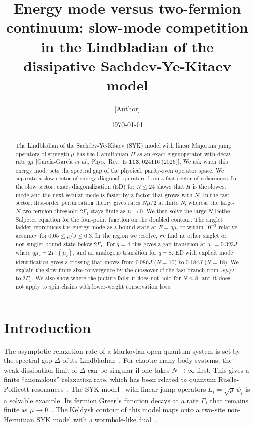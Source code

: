 \documentclass[aps,pre,twocolumn,superscriptaddress,amsmath,amssymb,10pt]{revtex4-2}
\begin{document}
\title{Energy mode versus two-fermion continuum: slow-mode competition in the Lindbladian of the dissipative Sachdev-Ye-Kitaev model}

\author{[Author]}
\affiliation{[Affiliation]}

\date{\today}

\begin{abstract}
The Lindbladian of the Sachdev-Ye-Kitaev (SYK) model with linear Majorana jump operators of strength $\mu$ has the Hamiltonian $H$ as an exact eigenoperator with decay rate $q\mu$ [Garc\'ia-Garc\'ia \emph{et al.}, Phys.\ Rev.\ E \textbf{113}, 024116 (2026)]. We ask when this energy mode sets the spectral gap of the physical, parity-even operator space. We separate a slow sector of energy-diagonal operators from a fast sector of coherences. In the slow sector, exact diagonalization (ED) for $N\le24$ shows that $H$ is the slowest mode and the next secular mode is faster by a factor that grows with $N$. In the fast sector, first-order perturbation theory gives rates $N\mu/2$ at finite $N$, whereas the large-$N$ two-fermion threshold $2\Gamma_1$ stays finite as $\mu\to0$. We then solve the large-$N$ Bethe-Salpeter equation for the four-point function on the doubled contour. The singlet ladder reproduces the energy mode as a bound state at $E=q\mu$, to within $10^{-3}$ relative accuracy for $0.05\le\mu/J\le0.3$. In the region we resolve, we find no other singlet or non-singlet bound state below $2\Gamma_1$. For $q=4$ this gives a gap transition at $\mu_c=0.323J$, where $q\mu_c=2\Gamma_1(\mu_c)$, and an analogous transition for $q=8$. ED with explicit mode identification gives a crossing that moves from $0.086J$ ($N=10$) to $0.184J$ ($N=18$). We explain the slow finite-size convergence by the crossover of the fast branch from $N\mu/2$ to $2\Gamma_1$. We also show where the picture fails: it does not hold for $N\le8$, and it does not apply to spin chains with lower-weight conservation laws.
\end{abstract}

\maketitle

\section{Introduction}

The asymptotic relaxation rate of a Markovian open quantum system is set by the spectral gap $\Delta$ of its Lindbladian~\cite{Kessler2012,Minganti2018}. For chaotic many-body systems, the weak-dissipation limit of $\Delta$ can be singular if one takes $N\to\infty$ first. This gives a finite ``anomalous'' relaxation rate, which has been related to quantum Ruelle-Pollicott resonances~\cite{Prosen2002,Mori2024,Jacoby2025,Zhang2026}. The SYK model~\cite{SY1993,Kitaev2015,MS2016} with linear jump operators $L_i=\sqrt\mu\,\psi_i$ is a solvable example. Its fermion Green's function decays at a rate $\Gamma_1$ that remains finite as $\mu\to0$~\cite{Kulkarni2022,Garcia2023}. The Keldysh contour of this model maps onto a two-site non-Hermitian SYK model with a wormhole-like dual~\cite{Garcia2023,MQ2018}.
\end{document}

